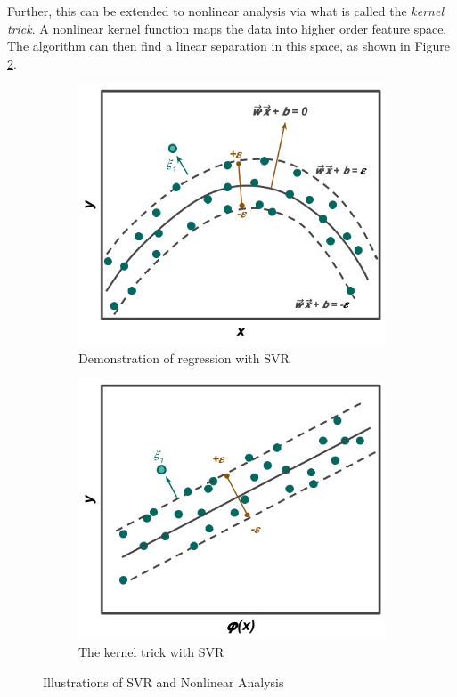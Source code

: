 Further, this can be extended to nonlinear analysis via what is called the
\textit{kernel trick}.  A nonlinear kernel function maps the data
into higher order feature space. The algorithm can then find a linear
separation in this space, as shown in Figure \ref{fig:svr-b}.

\begin{figure}[!hp]
  \centering
  \begin{subfigure}[h]{0.8\linewidth}
    \includegraphics[width=\linewidth]{./chapters/litrev/svr-a.png}
    \caption{Demonstration of regression with \acrshort{SVR}}
    \label{fig:svr-a}
  \end{subfigure}
  \begin{subfigure}[h]{0.8\linewidth}
    \includegraphics[width=\linewidth]{./chapters/litrev/svr-b.png}
    \caption{The kernel trick with \acrshort{SVR}}
    \label{fig:svr-b}
  \end{subfigure}
  \caption{Illustrations of \acrshort{SVR} and Nonlinear Analysis}
  \label{fig:svr}
\end{figure}

